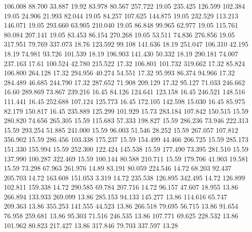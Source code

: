  106.008   88.700   33.887        19.92
  83.978   80.567  257.722        19.05
 235.425  126.599  102.384        19.05
  24.906   21.993   82.044        19.05
  84.257  107.625  144.875        19.05
 232.529  113.213  146.071        19.05
 293.660   63.905  210.040        19.05
  86.848   99.965   62.977        19.05
 115.761   80.084  207.141        19.05
  83.453   86.154  270.268        19.05
  53.511   74.836  276.856        19.05
 317.951   79.769  337.073        18.76
 123.592   99.108  141.636        18.19
 251.047  106.310   42.195        18.19
  74.981   93.726  101.539        18.19
 196.903  141.430   50.332        18.19
 290.181   74.007  237.163        17.61
 100.524   42.780  215.522        17.32
 106.801  101.732  319.662        17.32
  85.824  106.800  264.128        17.32
 294.956   40.274   54.551        17.32
  95.993   86.374   94.966        17.32
 284.489   46.685  244.790        17.32
 287.652   71.908  209.129        17.32
  95.127   71.033  246.662        16.60
 289.869   73.867  239.216        16.45
  84.126  124.641  123.158        16.45
 246.521  148.516  111.441        16.45
 252.688  107.124  125.773        16.45
 172.105  142.598   15.030        16.45
  85.975   82.179  150.817        16.45
 235.889  125.299  101.929        15.73
 283.184  107.842  150.515        15.59
 280.820   74.656  265.305        15.59
 115.683   57.333  198.827        15.59
 286.236   73.946  222.313        15.59
 293.254   51.885  241.000        15.59
  96.003   51.546   28.252        15.59
 267.057  107.812  356.902        15.59
 286.456  103.338  175.237        15.59
 154.499   44.466  206.725        15.59
 285.173  151.330  155.994        15.59
 252.300  122.424  145.538        15.59
 177.490   73.395  281.510        15.59
 137.990  100.287  322.469        15.59
 100.144   80.588  210.711        15.59
 179.706   41.903   19.581        15.59
  73.298   67.963  261.976        14.89
  83.191   80.059  224.546        14.72
  68.203   92.437  205.703        14.72
 163.608  151.053    3.319        14.72
 235.538  126.895  342.495        14.72
 126.899  102.811  159.338        14.72
 290.585   69.784  207.716        14.72
  96.157   47.607   18.955        13.86
 266.894  133.933  269.099        13.86
 285.153   94.133  145.277        13.86
 114.616   65.747  209.363        13.86
 355.253  141.555   44.523        13.86
 266.518   79.695   56.715        13.86
  91.654   76.958  259.681        13.86
  95.303   71.516  246.535        13.86
 107.771   69.625  228.532        13.86
 101.962   80.823  217.427        13.86
 317.846   79.703  337.597        13.28
